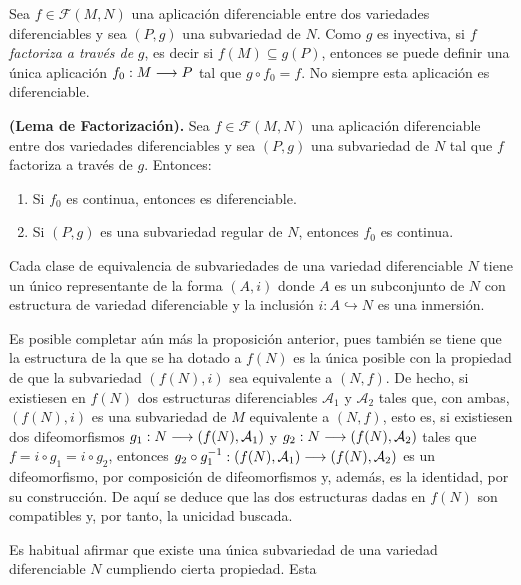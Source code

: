 \documentclass[Cursovd_portada.tex]{subfiles}
\begin{document}
Sea $f\in\mathcal{F}(M,N)$ una aplicación diferenciable entre
dos variedades diferenciables y sea $(P,g)$ una subvariedad de
$N$. Como $g$ es inyectiva, si $f$ {\it factoriza a través de}
$g$, es decir si $f(M)\subseteq g(P)$, entonces se puede definir
una única aplicación $f_0:M\longrightarrow P$ tal que $g\circ f_0=f$.
No siempre esta aplicación es diferenciable.
\begin{teorema}
{\bf (Lema de Factorización).} Sea $f\in\mathcal{F}(M,N)$ una
aplicación diferenciable entre dos variedades diferenciables y
sea $(P,g)$ una subvariedad de $N$ tal que $f$ factoriza a
través de $g$. Entonces:
\begin{enumerate}
\item Si $f_0$ es continua, entonces es diferenciable. \item Si
$(P,g)$ es una subvariedad regular de $N$, entonces $f_0$ es
continua.
\end{enumerate}
\end{teorema}
\begin{prop}
Cada clase de equivalencia de subvariedades de una variedad
diferenciable $N$ tiene un único representante de la forma
$(A,i)$ donde $A$ es un subconjunto de $N$ con estructura de
variedad diferenciable y la inclusión $i:A\hookrightarrow N$
es una inmersión.
\end{prop}
\hs Es posible completar aún más la proposición
anterior, pues también se tiene que la estructura de la que se
ha dotado a $f(N)$ es la única posible con la propiedad de que
la subvariedad $(f(N),i)$ sea equivalente a $(N,f)$. De hecho, si
existiesen en $f(N)$ dos estructuras diferenciables
$\mathcal{A}_1$ y $\mathcal{A}_2$ tales que, con ambas, $(f(N),i)$
es una subvariedad de $M$ equivalente a $(N,f)$, esto es, si
existiesen dos difeomorfismos $g_1:N\longrightarrow(f(N),\mathcal{A}_1)$ y
$g_2:N\longrightarrow(f(N),\mathcal{A}_2)$ tales que $f=i\circ g_1=i\circ
g_2$, entonces $g_2\circ
g_1^{-1}:(f(N),\mathcal{A}_1)\longrightarrow(f(N),\mathcal{A}_2)$ es un
difeomorfismo, por composición de difeomorfismos y,
además, es la identidad, por su construcción. De aquí
se deduce que las dos estructuras dadas en $f(N)$ son compatibles
y, por tanto, la unicidad buscada.
\par
\hs Es habitual afirmar que existe una única subvariedad de
una variedad diferenciable $N$ cumpliendo cierta propiedad. Esta
\end{document}
